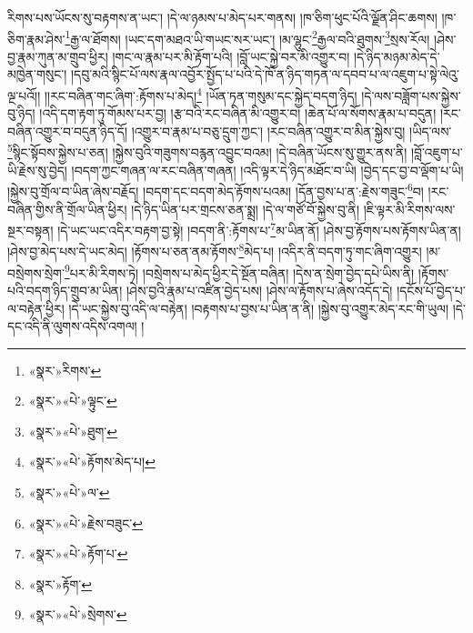 རིགས་པས་ཡོངས་སུ་བརྟགས་ན་ཡང་། །དེ་ལ་ཉམས་པ་མེད་པར་གནས། །ཁ་ཅིག་ཕུང་པོའི་ལྗོན་ཤིང་ཆགས། །ཁ་ཅིག་རྣམ་ཤེས་\footnote{«སྣར་»རིགས་}རྒྱ་ལ་ཐོགས། །ཡང་དག་མཐའ་ཡི་གཡང་སར་ཡང་། །མ་ལྷུང་\footnote{«སྣར་»«པེ་»ལྟུང་}རྒྱལ་བའི་ཐུགས་\footnote{«སྣར་»«པེ་»ཐུག་}སྲས་རོལ། །ཤེས་བྱ་རྣམ་ཀུན་མ་གྲུབ་ཕྱིར། །གང་ལ་རྣམ་པར་མི་རྟོག་པའི། །བློ་ཡང་སྐྱེ་བར་མི་འགྱུར་བ། །དེ་ཉིད་མཉམ་མེད་དེ་མཁྱེན་གསུང་། །དབུ་མའི་སྙིང་པོ་ལས་རྣལ་འབྱོར་སྤྱོད་པ་པའི་དེ་ཁོ་ན་ཉིད་གཏན་ལ་དབབ་པ་ལ་འཇུག་པ་སྟེ་ལེའུ་ལྔ་པའོ།། །།རང་བཞིན་གང་ཞིག་:རྟོགས་པ་མེད།\footnote{«སྣར་»«པེ་»རྟོགས་མེད་པ།} །ཡོན་ཏན་གསུམ་དང་སྐྱེད་བདག་ཉིད། །དེ་ལས་བཟློག་པས་སྐྱེས་བུ་ཉིད། །འདི་དག་རྟག་ཏུ་གོམས་པར་བྱ། །རྩ་བའི་རང་བཞིན་མི་འགྱུར་བ། །ཆེན་པོ་ལ་སོགས་རྣམ་པ་བདུན། །རང་བཞིན་འགྱུར་བ་བདུན་ཉིད་དོ། །འགྱུར་བ་རྣམ་པ་བཅུ་དྲུག་ཀྱང་། །རང་བཞིན་འགྱུར་བ་མིན་སྐྱེས་བུ། །ཡིད་ལས་\footnote{«སྣར་»«པེ་»ལ་}སྙིང་སྟོབས་སྐྱེས་པ་ཅན། །སྐྱེས་བུའི་གཟུགས་བརྙན་འབྱུང་བའམ། །དེ་བཞིན་ཡོངས་སུ་གྱུར་ནས་ནི། །བློ་འཇུག་པ་ཡི་རྗེས་སུ་བྱེད། །བདག་ཀྱང་གཞན་ལ་རང་བཞིན་གཞན། །འདི་ལྟར་དེ་ཉིད་མཐོང་བ་ཡི། །བྱེད་དང་བྱ་བ་ལྡོག་པ་ཡི། །སྐྱེས་བུ་གྲོལ་བ་ཡིན་ཞེས་བརྗོད། །བདག་དང་བདག་མེད་རྟོགས་པའམ། །དོན་བྱས་པ་ན་:རྗེས་གཟུང་\footnote{«སྣར་»«པེ་»རྗེས་བཟུང་}བ། །རང་བཞིན་གྱིས་ནི་གྲོལ་ཡིན་ཕྱིར། །དེ་ཉིད་ཡིན་པར་གྲངས་ཅན་སྨྲ། །དེ་ལ་གཙོ་བོ་སྐྱེས་བུ་ནི། །ཇི་ལྟར་མི་རིགས་ལས་སྔར་བསྟན། །དེ་ཡང་ཡང་འདིར་བརྟག་བྱ་སྟེ། །བདག་ནི་:རྟོགས་པ་\footnote{«སྣར་»«པེ་»རྟོག་པ་}མ་ཡིན་ནོ། །ཤེས་བྱ་རྟོགས་པས་རྟོགས་ཡིན་ན། །ཤེས་བྱ་མེད་པས་དེ་ཡང་མེད། །རྟོགས་པ་ཅན་ནམ་རྟོགས་\footnote{«སྣར་»རྟོག་}མེད་པ། །འདིར་ནི་བདག་ཏུ་གང་ཞིག་འགྱུར། །མ་བསྲེགས་སྲེག་\footnote{«སྣར་»«པེ་»སྲེགས་}པར་མི་རིགས་ཏེ། །བསྲེགས་པ་མེད་ཕྱིར་དེ་སྔོན་བཞིན། །དེས་ན་སྲེག་བྱེད་དཔེ་ཡིས་ནི། །རྟོགས་པའི་བདག་ཉིད་གྲུབ་མ་ཡིན། །ཤེས་བྱའི་རྣམ་པ་འཛིན་བྱེད་པས། །ཤེས་ལ་རྟོགས་པ་ཞེས་འདོད་དེ། །དངོས་པོ་བྱེད་པ་ལ་བརྟེན་ཕྱིར། །དེ་ཡང་སྐྱེས་བུ་འདི་ལ་བརྟེན། །བརྟགས་པ་བྱས་པ་ཡིན་ན་ནི། །སྐྱེས་བུ་འགྱུར་མེད་རང་གི་ཡུལ། །དེ་དང་འདི་ནི་ལུགས་འདིས་འགལ། །
